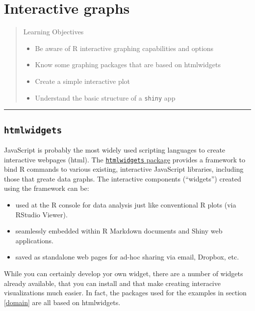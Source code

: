 \documentclass[]{book}
\providecommand{\tightlist}{%
  \setlength{\itemsep}{0pt}\setlength{\parskip}{0pt}}
\begin{document}
\hypertarget{interactive-graphs}{%
\chapter{Interactive graphs}\label{interactive-graphs}}

\begin{quote}
Learning Objectives

\begin{itemize}
\tightlist
\item
  Be aware of R interactive graphing capabilities and options
\item
  Know some graphing packages that are based on htmlwidgets
\item
  Create a simple interactive plot
\item
  Understand the basic structure of a \texttt{shiny} app
\end{itemize}
\end{quote}

\begin{center}\rule{0.5\linewidth}{\linethickness}\end{center}

\hypertarget{htmlwidgets}{%
\section{\texorpdfstring{\textbf{\texttt{htmlwidgets}}}{htmlwidgets}}\label{htmlwidgets}}

JavaScript is probably the most widely used scripting languages to create interactive webpages (html). The \href{(https://CRAN.R-project.org/package=htmlwidgets)}{\texttt{htmlwidgets} package} provides a framework to bind R commands to various existing, interactive JavaScript libraries, including those that greate data graphs. The interactive components (``widgets'') created using the framework can be:

\begin{itemize}
\tightlist
\item
  used at the R console for data analysis just like conventional R plots (via RStudio Viewer).
\item
  seamlessly embedded within R Markdown documents and Shiny web applications.
\item
  saved as standalone web pages for ad-hoc sharing via email, Dropbox, etc.
\end{itemize}

While you can certainly develop yor own widget, there are a number of widgets already available, that you can install and that make creating interacive visualizations much easier. In fact, the packages used for the examples in section \ref{domain} are all based on htmlwidgets.
\end{document}
